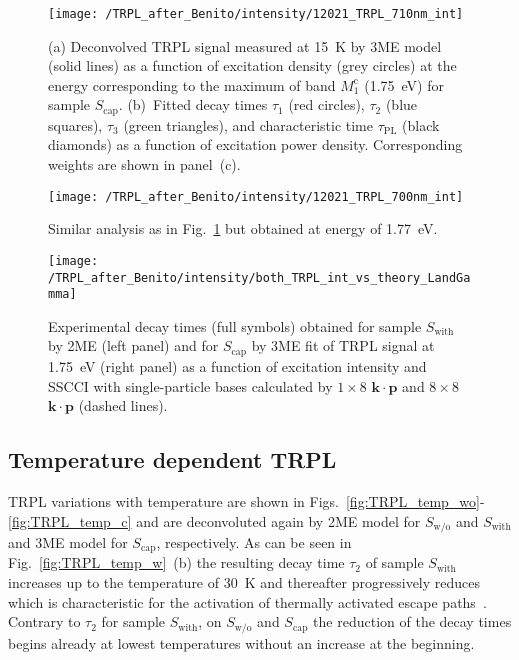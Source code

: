 {{\begin{figure}
	\centering
	\texttt{[image: /TRPL\_after\_Benito/intensity/12021\_TRPL\_710nm\_int]}
	\caption{(a) Deconvolved TRPL signal measured at 15~K by 3ME model (solid lines) as a function of excitation density (grey circles) at the energy corresponding to the maximum of band $M_1^\mathrm{c}$ (1.75~eV) for sample $S_\mathrm{cap}$. (b)~Fitted decay times $\tau_1$ (red circles), $\tau_2$ (blue squares), $\tau_3$ (green triangles), and characteristic time $\tau_\mathrm{PL}$ (black diamonds) as a function of excitation power density. Corresponding weights are shown in panel~(c).}
	\label{fig:TRPL_int_c}
\end{figure}

\begin{figure}
	\centering
	\texttt{[image: /TRPL\_after\_Benito/intensity/12021\_TRPL\_700nm\_int]}
	\caption{Similar analysis as in Fig.~\ref{fig:TRPL_int_c} but obtained at energy of 1.77~eV.}
	\label{fig:TRPL_int_c_L}
\end{figure}

\begin{figure}
	\centering
	\texttt{[image: /TRPL\_after\_Benito/intensity/both\_TRPL\_int\_vs\_theory\_LandGamma]}
	\caption{Experimental decay times (full symbols) obtained for sample $S_\mathrm{with}$ by 2ME (left panel) and for $S_\mathrm{cap}$ by 3ME fit of TRPL signal at 1.75~eV (right panel) as a function of excitation intensity and SSCCI with single-particle bases calculated by $1\times8$ $\mathbf{k\cdot p}$ and $8\times8$ $\mathbf{k\cdot p}$ (dashed lines).}
	\label{fig:TRPL_int_c_theory}
\end{figure}






\clearpage
\subsection{Temperature dependent TRPL}
\label{chap:TRPL_temp}
%
TRPL variations with temperature are shown in Figs.~\ref{fig:TRPL_temp_wo}-\ref{fig:TRPL_temp_c} and are deconvoluted again by 2ME model for $S_\mathrm{w/o}$ and $S_\mathrm{with}$ and 3ME model for $S_\mathrm{cap}$, respectively. As can be seen in Fig.~\ref{fig:TRPL_temp_w}~(b) the resulting decay time $\tau_2$ of sample $S_\mathrm{with}$ increases up to the temperature of 30~K and thereafter progressively reduces which is characteristic for the activation of thermally activated escape paths~\citep{Manna_apl2012_TRPLtype2}. Contrary to $\tau_2$ for sample $S_\mathrm{with}$, on $S_\mathrm{w/o}$ and $S_\mathrm{cap}$ the reduction of the decay times begins already at lowest temperatures without an increase at the beginning.

}}
